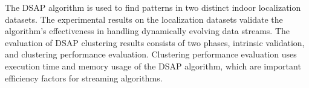 The DSAP algorithm is used to find patterns in two distinct indoor localization datasets. 
The experimental results on the localization datasets validate the algorithm's effectiveness in handling dynamically evolving data streams. The evaluation of DSAP clustering results consists of two phases, intrinsic validation, and clustering performance evaluation. Clustering performance evaluation uses execution time and memory usage of the DSAP algorithm, which are important efficiency factors for streaming algorithms. 








